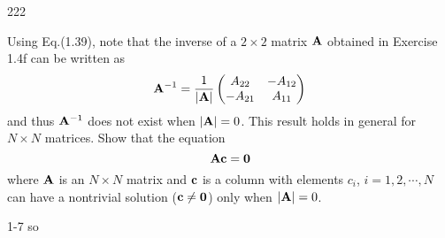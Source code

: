 \documentclass[a4paper]{book}
\newcommand{\A}{{\bf A}}
\begin{document}
	\begin{solution}
		222
	\end{solution}
	
	\begin{exercise}
	Using Eq.(1.39), note that the inverse of a $2 \times 2$ matrix $\A$ obtained in Exercise 1.4f can be written as
	\begin{equation*}
		\A^{-1} = \frac{1}{|\A|}\begin{pmatrix} A_{22} & -A_{12} \\ -A_{21} & A_{11}	\end{pmatrix}
	\end{equation*}
	and thus $\A^{-1}$ does not exist when $|\A|=0$. This result holds in general for $N \times N$ matrices. Show that the equation
	\begin{equation*}
		\A {\bf c} = {\bf 0}
	\end{equation*}
	where $\A$ is an $N \times N$ matrix and ${\bf c}$ is a column with elements $c_i$, $i = 1,2,\cdots,N$ can have a nontrivial solution (${\bf c}\neq{\bf 0}$) only when $|\A|=0$.
	\end{exercise}
	
	\begin{solution}
		1-7 so
	\end{solution}	
	
	
\end{document}
